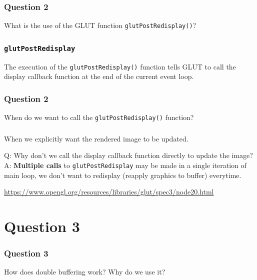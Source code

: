 \documentclass{beamer}
\begin{document}
\begin{frame}
    \frametitle{Question 2}

    What is the use of the GLUT function \texttt{glutPostRedisplay()}?

\end{frame}

\begin{frame}
    \frametitle{\texttt{glutPostRedisplay}}

    The execution of the \texttt{glutPostRedisplay()} function tells GLUT to call the 
    display callback function at the end of the current event loop. \\

\end{frame}

\begin{frame}
    \frametitle{Question 2}

    When do we want to call the \texttt{glutPostRedisplay()} function? 

\end{frame}

\begin{frame}
    \frametitle{}

    When we explicitly want the rendered image to be updated.  

    \vspace{1em}

    \begin{tcolorbox}
        Q: Why don’t we call the display callback function directly to update the image?\\
        \vspace{1em}
        A: \textbf{Multiple calls} to \texttt{glutPostRedisplay} may be made in a single iteration of main loop,
        we don't want to redisplay (reapply graphics to buffer) everytime.
    \end{tcolorbox}

    \hyperlink{Reference}{https://www.opengl.org/resources/libraries/glut/spec3/node20.html}

\end{frame}

\section{Question 3}

\begin{frame}
    \frametitle{Question 3}
    How does double buffering work?  Why do we use it?
\end{frame}
\end{document}
